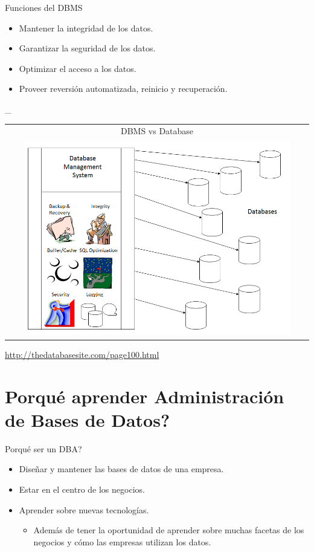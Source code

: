 \documentclass{beamer}
\newcommand{\toRight}[1]{
    \begin{FlushRight}
        {\tiny #1}
    \end{FlushRight}
} %
\begin{document}
\begin{frame}{Funciones del DBMS}
    \begin{itemize}
        \item Mantener la integridad de los datos.
        \item Garantizar la seguridad de los datos.
        \item Optimizar el acceso a los datos.
        \item Proveer reversión automatizada, reinicio y recuperación.
    \end{itemize}
\end{frame}

\begin{frame}{\_}
    \begin{tabular}{c}
        DBMS vs Database \\
        \includegraphics[width=0.9\textwidth]{figures/dbms_vs_database.png}
    \end{tabular}
    \toRight{\url{http://thedatabasesite.com/page100.html}}
\end{frame}

\section{Porqué aprender Administración de Bases de Datos?}

\begin{frame}{Porqué ser un DBA?}
    \begin{itemize}
        \item Diseñar y mantener las bases de datos de una empresa.
        \item Estar en el centro de los negocios.
        \item Aprender sobre nuevas tecnologías.
        \begin{itemize}
            \item Además de tener la oportunidad de aprender sobre muchas facetas de los negocios y cómo las empresas utilizan los datos.
        \end{itemize}
    \end{itemize}
\end{frame}
\end{document}
